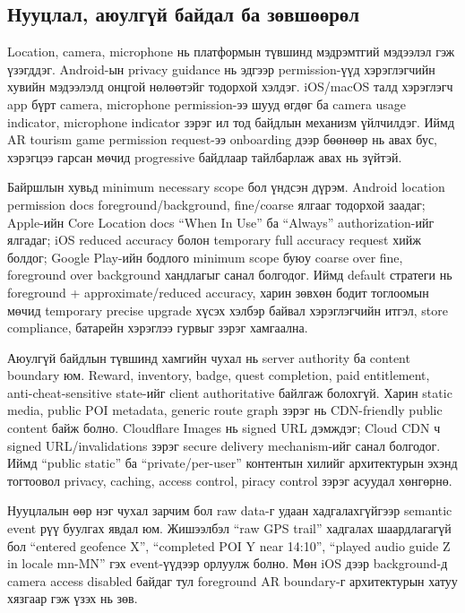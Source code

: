 \begin{sloppy}
\section*{Нууцлал, аюулгүй байдал ба зөвшөөрөл}

Location, camera, microphone нь платформын түвшинд мэдрэмтгий мэдээлэл гэж үзэгддэг. Android-ын privacy guidance нь эдгээр permission-үүд хэрэглэгчийн хувийн мэдээлэлд онцгой нөлөөтэйг тодорхой хэлдэг. iOS/macOS талд хэрэглэгч app бүрт camera, microphone permission-ээ шууд өгдөг ба camera usage indicator, microphone indicator зэрэг ил тод байдлын механизм үйлчилдэг. Иймд AR tourism game permission request-ээ onboarding дээр бөөнөөр нь авах бус, хэрэгцээ гарсан мөчид progressive байдлаар тайлбарлаж авах нь зүйтэй.

Байршлын хувьд minimum necessary scope бол үндсэн дүрэм. Android location permission docs foreground/background, fine/coarse ялгааг тодорхой заадаг; Apple-ийн Core Location docs ``When In Use'' ба ``Always'' authorization-ийг ялгадаг; iOS reduced accuracy болон temporary full accuracy request хийж болдог; Google Play-ийн бодлого minimum scope буюу coarse over fine, foreground over background хандлагыг санал болгодог. Иймд default стратеги нь foreground + approximate/reduced accuracy, харин зөвхөн бодит тоглоомын мөчид temporary precise upgrade хүсэх хэлбэр байвал хэрэглэгчийн итгэл, store compliance, батарейн хэрэглээ гурвыг зэрэг хамгаална.

Аюулгүй байдлын түвшинд хамгийн чухал нь server authority ба content boundary юм. Reward, inventory, badge, quest completion, paid entitlement, anti-cheat-sensitive state-ийг client authoritative байлгаж болохгүй. Харин static media, public POI metadata, generic route graph зэрэг нь CDN-friendly public content байж болно. Cloudflare Images нь signed URL дэмждэг; Cloud CDN ч signed URL/invalidations зэрэг secure delivery mechanism-ийг санал болгодог. Иймд ``public static'' ба ``private/per-user'' контентын хилийг архитектурын эхэнд тогтоовол privacy, caching, access control, piracy control зэрэг асуудал хөнгөрнө.

Нууцлалын өөр нэг чухал зарчим бол raw data-г удаан хадгалахгүйгээр semantic event рүү буулгах явдал юм. Жишээлбэл ``raw GPS trail'' хадгалах шаардлагагүй бол ``entered geofence X'', ``completed POI Y near 14:10'', ``played audio guide Z in locale mn-MN'' гэх event-үүдээр орлуулж болно. Мөн iOS дээр background-д camera access disabled байдаг тул foreground AR boundary-г архитектурын хатуу хязгаар гэж үзэх нь зөв.


\end{sloppy}

